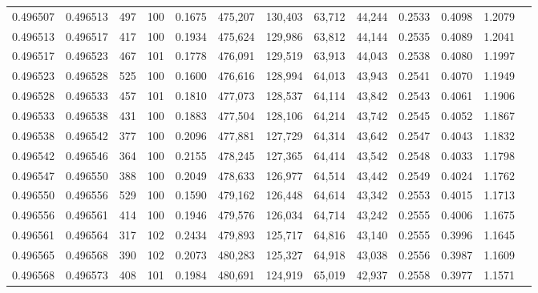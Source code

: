 \begin{tabular}{rrrrrrrrrrrrr}
0.496507 & 0.496513 &   497 & 100 &                                     0.1675 & 475,207 & 130,403 &  63,712 &  44,244 & 0.2533 & 0.4098 & 1.2079 \\
0.496513 & 0.496517 &   417 & 100 &                                     0.1934 & 475,624 & 129,986 &  63,812 &  44,144 & 0.2535 & 0.4089 & 1.2041 \\
0.496517 & 0.496523 &   467 & 101 &                                     0.1778 & 476,091 & 129,519 &  63,913 &  44,043 & 0.2538 & 0.4080 & 1.1997 \\
0.496523 & 0.496528 &   525 & 100 &                                     0.1600 & 476,616 & 128,994 &  64,013 &  43,943 & 0.2541 & 0.4070 & 1.1949 \\
0.496528 & 0.496533 &   457 & 101 &                                     0.1810 & 477,073 & 128,537 &  64,114 &  43,842 & 0.2543 & 0.4061 & 1.1906 \\
0.496533 & 0.496538 &   431 & 100 &                                     0.1883 & 477,504 & 128,106 &  64,214 &  43,742 & 0.2545 & 0.4052 & 1.1867 \\
0.496538 & 0.496542 &   377 & 100 &                                     0.2096 & 477,881 & 127,729 &  64,314 &  43,642 & 0.2547 & 0.4043 & 1.1832 \\
0.496542 & 0.496546 &   364 & 100 &                                     0.2155 & 478,245 & 127,365 &  64,414 &  43,542 & 0.2548 & 0.4033 & 1.1798 \\
0.496547 & 0.496550 &   388 & 100 &                                     0.2049 & 478,633 & 126,977 &  64,514 &  43,442 & 0.2549 & 0.4024 & 1.1762 \\
0.496550 & 0.496556 &   529 & 100 &                                     0.1590 & 479,162 & 126,448 &  64,614 &  43,342 & 0.2553 & 0.4015 & 1.1713 \\
0.496556 & 0.496561 &   414 & 100 &                                     0.1946 & 479,576 & 126,034 &  64,714 &  43,242 & 0.2555 & 0.4006 & 1.1675 \\
0.496561 & 0.496564 &   317 & 102 &                                     0.2434 & 479,893 & 125,717 &  64,816 &  43,140 & 0.2555 & 0.3996 & 1.1645 \\
0.496565 & 0.496568 &   390 & 102 &                                     0.2073 & 480,283 & 125,327 &  64,918 &  43,038 & 0.2556 & 0.3987 & 1.1609 \\
0.496568 & 0.496573 &   408 & 101 &                                     0.1984 & 480,691 & 124,919 &  65,019 &  42,937 & 0.2558 & 0.3977 & 1.1571 \\

\end{tabular}
